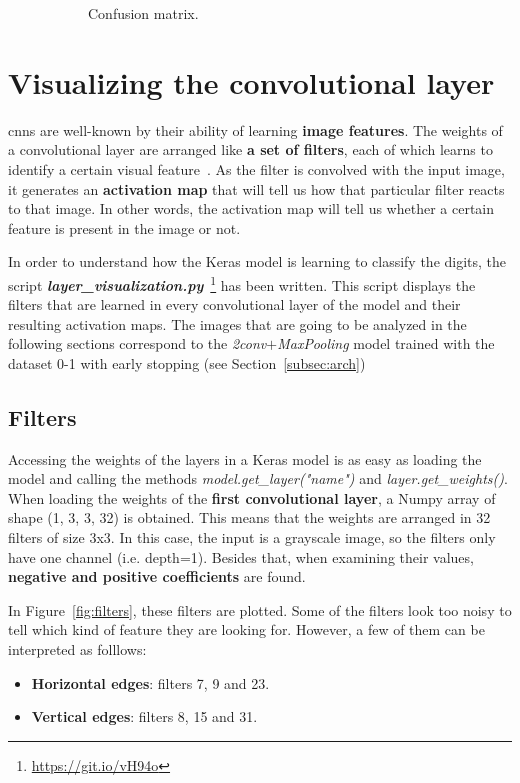\begin{figure}
\begin{subfigure}{0.5\textwidth}
		\caption{Confusion matrix.}
	\end{subfigure}
	\caption[Example of usage of \textit{benchmark.m}.]{}
	\label{fig:benchmark}
\end{figure}

\section{Visualizing the convolutional layer}
\glspl{cnn} are well-known by their ability of learning \textbf{image features}. The weights of a convolutional layer are arranged like \textbf{a set of filters}, each of which learns to identify a certain visual feature~\cite{cs231n}. As the filter is convolved with the input image, it generates an \textbf{activation map} that will tell us how that particular filter reacts to that image. In other words, the activation map will tell us whether a certain feature is present in the image or not.

In order to understand how the Keras model is learning to classify the digits, the script \textbf{\textit{layer\_visualization.py}}~\footnote{\url{https://git.io/vH94o}} has been written. This script displays the filters that are learned in every convolutional layer of the model and their resulting activation maps. The images that are going to be analyzed in the following sections correspond to the \textit{2conv$+$MaxPooling} model trained with the dataset 0-1 with early stopping (see Section~\ref{subsec:arch}) 

\subsection{Filters}
Accessing the weights of the layers in a Keras model is as easy as loading the model and calling the methods \textit{model.get\_layer("name")} and \textit{layer.get\_weights()}. When loading the weights of the \textbf{first convolutional layer}, a Numpy array of shape (1, 3, 3, 32) is obtained. This means that the weights are arranged in 32 filters of size 3x3. In this case, the input is a grayscale image, so the filters only have one channel (i.e. depth=1). Besides that, when examining their values, \textbf{negative and positive coefficients} are found.

In Figure~\ref{fig:filters}, these filters are plotted. Some of the filters look too noisy to tell which kind of feature they are looking for. However, a few of them can be interpreted as folllows:
\begin{itemize}
	\item \textbf{Horizontal edges}: filters 7, 9 and 23.
	\item \textbf{Vertical edges}: filters 8, 15 and 31.	
\end{itemize}

